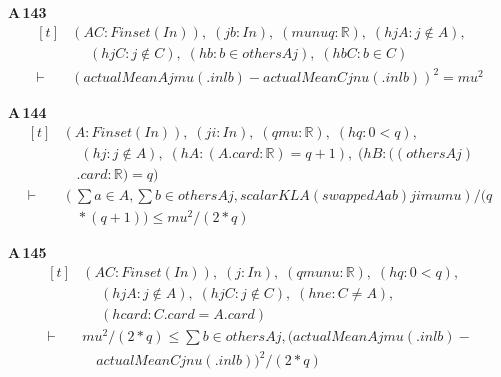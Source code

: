 \noindent\textbf{A\,143}\quad{}
{\footnotesize\[ \begin{aligned}[t]
&(\mathit{A} \mathit{C} : \mathit{Finset} (\mathit{I} \mathit{n})),\; (\mathit{j} \mathit{b} : \mathit{I} \mathit{n}),\; (\mathit{mu} \mathit{nu} \mathit{q} : \mathbb{R} ),\; (\mathit{hjA} : \mathit{j} \notin \mathit{A}),\\
&\quad \; (\mathit{hjC} : \mathit{j} \notin \mathit{C}),\; (\mathit{hb} : \mathit{b} \in \mathit{others} \mathit{A} \mathit{j}),\; (\mathit{hbC} : \mathit{b} \in \mathit{C})\\
\vdash\;&(\mathit{actualMean} \mathit{A} \mathit{j} \mathit{mu} (.\mathit{inl} \mathit{b})-\mathit{actualMean} \mathit{C} \mathit{j} \mathit{nu} (.\mathit{inl} \mathit{b}))^{2}=\mathit{mu}^{2}
\end{aligned} \]}

\noindent\textbf{A\,144}\quad{}
{\footnotesize\[ \begin{aligned}[t]
&(\mathit{A} : \mathit{Finset} (\mathit{I} \mathit{n})),\; (\mathit{j} \mathit{i} : \mathit{I} \mathit{n}),\; (\mathit{q} \mathit{mu} : \mathbb{R} ),\; (\mathit{hq} : 0<\mathit{q}),\\
&\quad \; (\mathit{hj} : \mathit{j} \notin \mathit{A}),\; (\mathit{hA} : (\mathit{A}.\mathit{card}:\mathbb{R} )=\mathit{q}+1),\; (\mathit{hB} : ((\mathit{others} \mathit{A} \mathit{j})\\
&\quad .\mathit{card}:\mathbb{R} )=\mathit{q})\\
\vdash\;&(\textstyle\sum \mathit{a} \in \mathit{A},\textstyle\sum \mathit{b} \in \mathit{others} \mathit{A} \mathit{j},\mathit{scalarKL} \mathit{A} (\mathit{swapped} \mathit{A} \mathit{a} \mathit{b}) \mathit{j} \mathit{i} \mathit{mu} \mathit{mu})/(\mathit{q}\\
&\quad *(\mathit{q}+1)) \leq \mathit{mu}^{2}/(2*\mathit{q})
\end{aligned} \]}

\noindent\textbf{A\,145}\quad{}
{\footnotesize\[ \begin{aligned}[t]
&(\mathit{A} \mathit{C} : \mathit{Finset} (\mathit{I} \mathit{n})),\; (\mathit{j} : \mathit{I} \mathit{n}),\; (\mathit{q} \mathit{mu} \mathit{nu} : \mathbb{R} ),\; (\mathit{hq} : 0<\mathit{q}),\\
&\quad \; (\mathit{hjA} : \mathit{j} \notin \mathit{A}),\; (\mathit{hjC} : \mathit{j} \notin \mathit{C}),\; (\mathit{hne} : \mathit{C} \neq \mathit{A}),\\
&\quad \; (\mathit{hcard} : \mathit{C}.\mathit{card}=\mathit{A}.\mathit{card})\\
\vdash\;&\mathit{mu}^{2}/(2*\mathit{q}) \leq \textstyle\sum \mathit{b} \in \mathit{others} \mathit{A} \mathit{j}, (\mathit{actualMean} \mathit{A} \mathit{j} \mathit{mu} (.\mathit{inl} \mathit{b})-\\
&\quad \mathit{actualMean} \mathit{C} \mathit{j} \mathit{nu} (.\mathit{inl} \mathit{b}))^{2}/(2*\mathit{q})
\end{aligned} \]}

